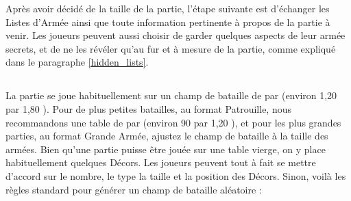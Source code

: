 Après avoir décidé de la taille de la partie, l'étape suivante est d'échanger les Listes d'Armée ainsi que toute information pertinente à propos de la partie à venir. Les joueurs peuvent aussi choisir de garder quelques aspects de leur armée secrets, et de ne les révéler qu'au fur et à mesure de la partie, comme expliqué dans le paragraphe \ref{hidden_lists}.

\newpage
\subsection[Installer le champ de bataille]{}

La partie se joue habituellement sur un champ de bataille de  par  (environ 1,20 {\meter} par 1,80 {\meter}). Pour de plus petites batailles, au format Patrouille, nous recommandons une table de  par  (environ 90 {\centi\meter} par 1,20 {\meter}), et pour les plus grandes parties, au format Grande Armée, ajustez le champ de bataille à la taille des armées. Bien qu'une partie puisse être jouée sur une table vierge, on y place habituellement quelques Décors. Les joueurs peuvent tout à fait se mettre d'accord sur le nombre, le type la taille et la position des Décors. Sinon, voilà les règles standard pour générer un champ de bataille aléatoire :

